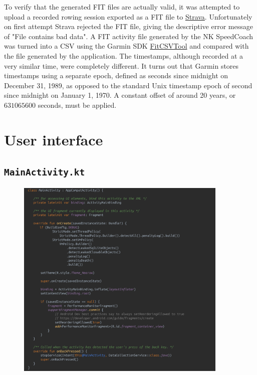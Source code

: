 \documentclass[11pt,twoside,a4paper]{report}
\begin{document}
To verify that the generated FIT files are actually valid, it was attempted to upload a recorded rowing session exported as a FIT file to \href{https://strava.com}{Strava}. Unfortunately on first attempt Strava rejected the FIT file, giving the descriptive error message of "File contains bad data". A FIT activity file generated by the NK SpeedCoach was turned into a CSV using the Garmin SDK \href{https://developer.garmin.com/fit/fitcsvtool/commandline/}{FitCSVTool} and compared with the file generated by the application. The timestamps, although recorded at a very similar time, were completely different. It turns out that Garmin stores timestamps using a separate epoch, defined as seconds since midnight on December 31, 1989, as opposed to the standard Unix timestamp epoch of second since midnight on January 1, 1970.\cite{garmin_epoch} A constant offset of around 20 years, or $631065600$ seconds, must be applied.

\section{User interface}

\subsection{\texttt{MainActivity.kt}}

\begin{figure}[h!]
  \centering
  \includegraphics[width=0.9\textwidth]{code-MainActivity.png}
  \caption{}
  \label{fig:MainActivity}
\end{figure}
\end{document}
